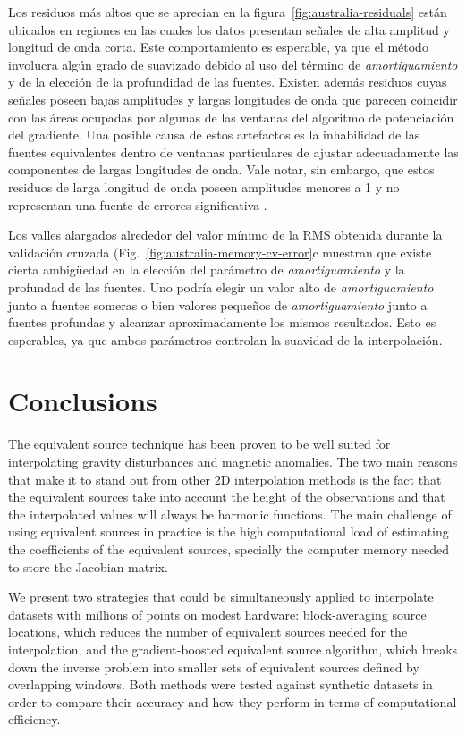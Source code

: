 Los residuos más altos que se aprecian en la figura~\ref{fig:australia-residuals}
están ubicados en regiones en las cuales los datos presentan señales de alta
amplitud y longitud de onda corta.
Este comportamiento es esperable, ya que el método involucra algún grado de
suavizado debido al uso del término de \emph{amortiguamiento} y de la elección
de la profundidad de las fuentes.
Existen además residuos cuyas señales poseen bajas amplitudes y largas
longitudes de onda que parecen coincidir con las áreas ocupadas por algunas de
las ventanas del algoritmo de potenciación del gradiente.
Una posible causa de estos artefactos es la inhabilidad de las fuentes
equivalentes dentro de ventanas particulares de ajustar adecuadamente
las componentes de largas longitudes de onda.
Vale notar, sin embargo, que estos residuos de larga longitud de onda poseen
amplitudes menores a 1\mGal{} y no representan una fuente de errores
significativa .

Los valles alargados alrededor del valor mínimo de la \ac{RMS} obtenida durante
la validación cruzada
(Fig.~\ref{fig:australia-memory-cv-error}c muestran que existe cierta
ambigüedad en la elección del parámetro de \emph{amortiguamiento} y la
profundad de las fuentes.
Uno podría elegir un valor alto de \emph{amortiguamiento} junto a fuentes
someras o bien valores pequeños de \emph{amortiguamiento} junto a fuentes
profundas y alcanzar aproximadamente los mismos resultados.
Esto es esperables, ya que ambos parámetros controlan la suavidad de la
interpolación.


\section{Conclusions}

The equivalent source technique has been proven to be well suited for
interpolating gravity disturbances and magnetic anomalies.
The two main reasons that make it to stand out from other 2D interpolation
methods is the fact that the equivalent sources take into account the height of
the observations and that the interpolated values will always be harmonic
functions.
The main challenge of using equivalent sources in practice is the high
computational load of estimating the coefficients of the equivalent sources,
specially the computer memory needed to store the Jacobian matrix.

We present two strategies that could be simultaneously applied to interpolate
datasets with millions of points on modest hardware:
block-averaging source locations, which reduces the number of equivalent
sources needed for the interpolation,
and the gradient-boosted equivalent source algorithm, which breaks down the
inverse problem into smaller sets of equivalent sources defined by overlapping
windows.
Both methods were tested against synthetic datasets in order to compare their
accuracy and how they perform in terms of computational efficiency.

